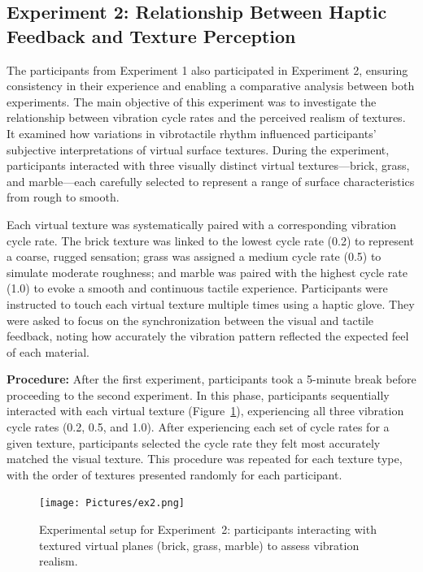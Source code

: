 \subsection{Experiment 2: Relationship Between Haptic Feedback and Texture Perception}
The participants from Experiment 1 also participated in Experiment 2, ensuring consistency in their experience and enabling a comparative analysis between both experiments. The main objective of this experiment was to investigate the relationship between vibration cycle rates and the perceived realism of textures. It examined how variations in vibrotactile rhythm influenced participants’ subjective interpretations of virtual surface textures. During the experiment, participants interacted with three visually distinct virtual textures—brick, grass, and marble—each carefully selected to represent a range of surface characteristics from rough to smooth.

Each virtual texture was systematically paired with a corresponding vibration cycle rate. The brick texture was linked to the lowest cycle rate (0.2) to represent a coarse, rugged sensation; grass was assigned a medium cycle rate (0.5) to simulate moderate roughness; and marble was paired with the highest cycle rate (1.0) to evoke a smooth and continuous tactile experience. Participants were instructed to touch each virtual texture multiple times using a haptic glove. They were asked to focus on the synchronization between the visual and tactile feedback, noting how accurately the vibration pattern reflected the expected feel of each material.

\textbf{Procedure:} After the first experiment, participants took a 5-minute break before proceeding to the second experiment. In this phase, participants sequentially interacted with each virtual texture (Figure~\ref{fig:experiment2_setup}), experiencing all three vibration cycle rates (0.2, 0.5, and 1.0). After experiencing each set of cycle rates for a given texture, participants selected the cycle rate they felt most accurately matched the visual texture. This procedure was repeated for each texture type, with the order of textures presented randomly for each participant.

\begin{figure}[H]\centering
	\texttt{[image: Pictures/ex2.png]}%
	\caption{Experimental setup for Experiment~2: participants interacting with textured virtual planes (brick, grass, marble) to assess vibration realism.}\label{fig:experiment2_setup}
\end{figure}

